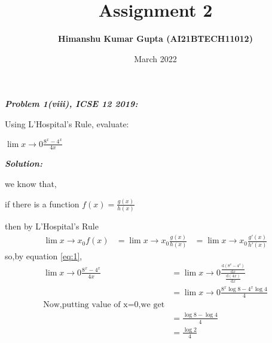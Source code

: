 \documentclass[journal,12pt,twocolumn]{IEEEtran}
\begin{document}
\newcommand{\myvec}[1]{\ensuremath{\begin{pmatrix}#1\end{pmatrix}}}

\let\vec\mathbf


\title{Assignment 2}
\author{\textbf{Himanshu Kumar Gupta (AI21BTECH11012)}}
\maketitle
\date {March 2022}


\textbf{\textit{Problem 1(viii), ICSE 12 2019:}}

Using L’Hospital’s Rule, evaluate:

 $\lim{x\to0} \frac{8^x-4^x}{4x}$

\textbf{\textit{Solution:}}

we know that,

if there is a function $f(x)=\frac{g(x)}{h(x)}$

then by L’Hospital’s Rule 
\begin{align}
\label{eq:1}
\lim{x\to x_0} f(x)&=\lim{x\to x_0} \frac{g(x)}{h(x)}
&=\lim{x\to x_0} \frac{g'(x)}{h'(x)}
\end{align}
so,by equation \eqref{eq:1},
\begin{align}
\lim{x\to0} \frac{8^x-4^x}{4x}&=\lim{x\to0} \frac{\frac{\mathrm{d}(8^x-4^x)}{\mathrm{d}x}}{\frac{\mathrm{d}(4x)}{\mathrm{d}x}}         \\
&=\lim{x\to0}\frac{8^x\log{8}-4^x\log{4}}{4}\\
\text{Now,putting value of x=0,we get}       \nonumber\\
&=\frac{\log{8}-\log{4}}{4}       \\
&=\frac{\log{2}}{4}
\end{align}
\end{document}
